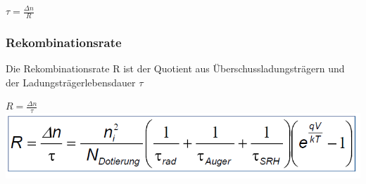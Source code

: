 	$\tau =\frac{\Delta n}{R}$
	
	
	\subsubsection{Rekombinationsrate}

	Die Rekombinationsrate R ist der Quotient aus Überschussladungsträgern und der Ladungsträgerlebensdauer $\tau$
 
		$R =\frac{\Delta n}{\tau}$
		\newline
		\includegraphics[width=0.4\linewidth]{Kapitel/Kap05/Rekombinationsrate}
		

	
